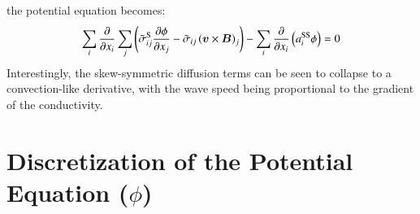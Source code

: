 \documentclass[twoside,9pt,twocolumn]{aiaa}
\renewcommand{\vec}[1]{\bm{#1}}
\begin{document}
%
the potential equation becomes:
%
\begin{equation}
\sum_i \frac{\partial}{\partial x_i}   \sum_j   \left(\wtilde{\sigma}_{ij}^{\rm S}\frac{\partial \phi}{\partial x_j}  - \wtilde{\sigma}_{ij}\left(\vec{v} \times \vec{B}\right)_j\right) 
- \sum_i     \frac{\partial }{\partial x_i}\left(a_i^{\rm SS} \phi\right) 
=0
\end{equation}
%
Interestingly, the skew-symmetric diffusion terms can be seen to collapse to a convection-like derivative, with the wave speed being proportional to the gradient of the conductivity. 


\section{Discretization of the Potential Equation ($\phi$)}
\end{document}
